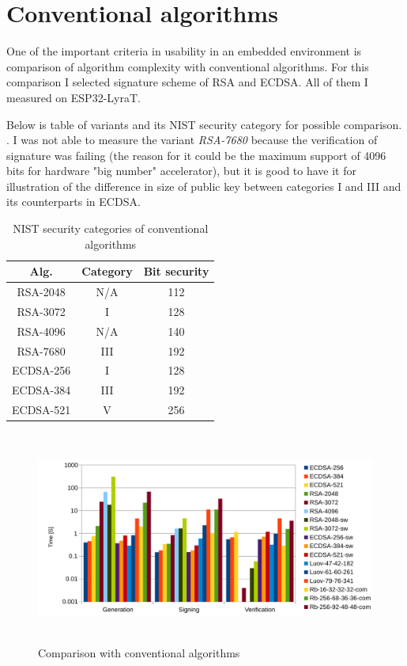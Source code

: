 \documentclass[thesis=M,english]{FITthesis}[2019/12/23]
\begin{document}
\section{Conventional algorithms}
One of the important criteria in usability in an embedded environment is comparison of algorithm complexity with conventional algorithms. For this comparison I selected signature scheme of RSA and ECDSA. All of them I measured on ESP32-LyraT.

\bigskip
\noindent
Below is table of variants and its NIST security category for possible comparison. \cite{L-NIST-RECOMM}. I was not able to measure the variant \textit{RSA-7680} because the verification of signature was failing (the reason for it could be the maximum support of 4096 bits for hardware "big number" accelerator), but it is good to have it for illustration of the difference in size of public key between categories I and III and its counterparts in ECDSA.
\begin{table}[H]
\centering
\begin{tabular}{|c|c|c|}
\hline
Alg. & Category & Bit security \\ \hline
RSA-2048 & N/A & 112 \\ \hline
RSA-3072 & I & 128 \\ \hline
RSA-4096 & N/A & 140 \\ \hline
RSA-7680 & III & 192 \\ \hline
ECDSA-256 & I & 128 \\ \hline
ECDSA-384 & III & 192 \\ \hline
ECDSA-521 & V & 256 \\ \hline
\end{tabular}
\caption{NIST security categories of conventional algorithms}
\end{table}

\begin{figure}[H]
\centering
\includegraphics[width=13cm,height=7cm]{images/time-all.pdf}
\caption{Comparison with conventional algorithms}
\label{time-all}
\end{figure}
\end{document}
